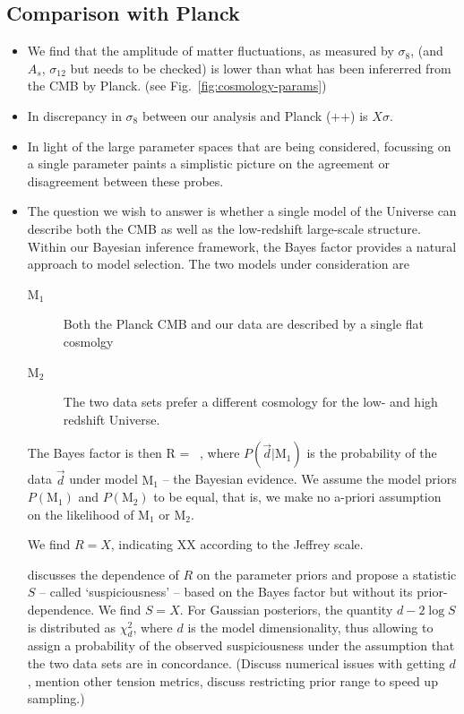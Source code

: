 \subsection{Comparison with Planck}
\label{sec:planck_comp}
\begin{itemize}
	\item We find that the amplitude of matter fluctuations, as measured by $\sigma_{8}$, (and $A_{s}$, $\sigma_{12}$ but needs to be checked) is lower than what has been infererred from the CMB by Planck. (see Fig.~\ref{fig:cosmology-params})
	\item In discrepancy in $\sigma_{8}$ between our  \tttp analysis and Planck (++) is $X\sigma$.
	\item In light of the large parameter spaces that are being considered, focussing on a single parameter paints a simplistic picture on the agreement or disagreement between these probes.
	\item The question we wish to answer is whether a single model of the Universe can describe both the CMB as well as the low-redshift large-scale structure.
	Within our Bayesian inference framework, the Bayes factor provides a natural approach to model selection.
	The two models under consideration are 
	\begin{description}
		\item[$\mathrm{M}_1$] Both the Planck CMB and our \tttp data are described by a single flat \LCDM cosmolgy
		\item[$\mathrm{M}_2$] The two data sets prefer a different cosmology for the low- and high redshift Universe.
	\end{description}
	The Bayes factor is then
	\be
		R =  \ ,
	\ee
	where $P(\vec d | \mathrm{M}_1)$ is the probability of the data $\vec d$ under model $\mathrm{M}_1$ -- the Bayesian evidence. 
	We assume the model priors $P(\mathrm{M}_1)$ and $P(\mathrm{M}_2)$ to be equal, that is, we make no a-priori assumption on the likelihood of $\mathrm{M}_1$ or $\mathrm{M}_2$. 
	
	We find $R=X$, indicating XX according to the Jeffrey scale. 
	
	\citet{Handley2019} discusses the dependence of $R$ on the parameter priors and propose a statistic $S$ -- called `suspiciousness' -- based on the Bayes factor but without its prior-dependence. 
	We find $S=X$. 
	For Gaussian posteriors, the quantity $d-2\log S$ is distributed as $\chi^2_{d}$, where $d$ is the model dimensionality, thus allowing to assign a probability of the observed suspiciousness under the assumption that the two data sets are in concordance.
	(Discuss numerical issues with getting $d$, mention other tension metrics, discuss restricting prior range to speed up sampling.) 
\end{itemize}



